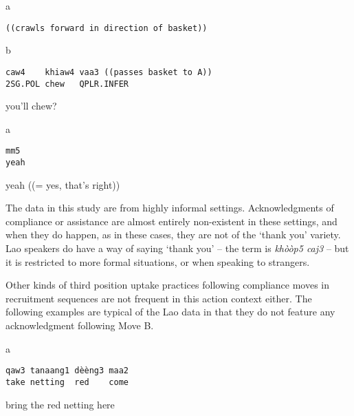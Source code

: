 \documentclass[output=paper]{langsci/langscibook}
\begin{document}
\newpage
{}\vspace{-1mm}
%
\begin{mdframednoverticalspace}[style=firstfoc]
\begin{transbox}{1}{a}
\begin{verbatim}
((crawls forward in direction of basket))
\end{verbatim}
\end{transbox}
\end{mdframednoverticalspace}
%
\begin{mdframednoverticalspace}[style=secondfoc]
\begin{transbox}{2}{b}
\begin{verbatim}
caw4    khiaw4 vaa3 ((passes basket to A))
2SG.POL chew   QPLR.INFER
\end{verbatim}
you'll chew? 
\end{transbox}
\end{mdframednoverticalspace}
%
\begin{transbox}{3}{a}
\begin{verbatim}
mm5
yeah
\end{verbatim}
yeah ((= yes, that’s right))
\end{transbox}\bigskip

The data in this study are from highly informal settings. Acknowledgments of compliance or assistance are almost entirely non-existent in these settings, and when they do happen, as in these cases, they are not of the ‘thank you’ variety. Lao speakers do have a way of saying ‘thank you’ -- the term is \textit{khòòp5 caj3} -- but it is restricted to more formal situations, or when speaking to strangers.

Other kinds of third position uptake practices following compliance moves in recruitment sequences are not frequent in this action context either. The following examples are typical of the Lao data in that they do not feature any acknowledgment following Move B.

\vspace{-1mm}
%
\begin{mdframednoverticalspace}[style=firstfoc]
\begin{transbox}{1}{a}
\begin{verbatim}
qaw3 tanaang1 dèèng3 maa2
take netting  red    come
\end{verbatim}
bring the red netting here
\end{transbox}
\end{mdframednoverticalspace}
%
\begin{mdframednoverticalspace}[style=secondfoc]
\end{mdframednoverticalspace}\vspace{-1mm}
%
\smallskip
\end{document}
